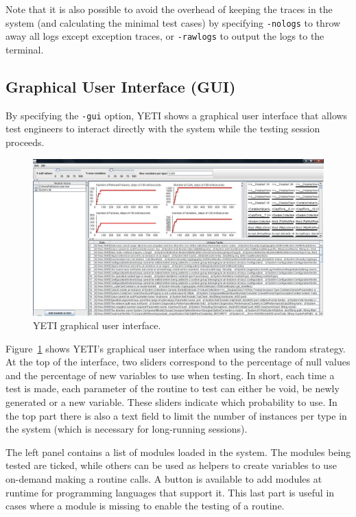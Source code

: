 Note that it is also possible to avoid the overhead of keeping the 
traces in the system (and calculating the minimal test cases) by specifying 
\texttt{-nologs} to throw away all logs except exception traces, or 
\texttt{-rawlogs} to output the logs to the terminal.

\subsection{Graphical User Interface (GUI)}
By specifying the \texttt{-gui} option, YETI shows a graphical user interface
that allows test engineers to interact directly with the system while the testing 
session proceeds. 

\begin{figure}[h!]
\begin{center}
\begin{sideways}
\includegraphics[width=24cm]{images/ScreenShotdotNET.png}
\end{sideways}
\end{center}
\caption{YETI graphical user interface.}\label{fig:gui}
\end{figure}


Figure~\ref{fig:gui} shows YETI's graphical user interface when using 
the random strategy. At the top of the interface, two sliders correspond to 
the percentage of null values and the percentage of new variables to use when testing.
In short, each time a test is made, each parameter of the routine to test can either 
be void, be newly generated or a new variable. These sliders indicate which probability 
to use. In the top part there is also a text field to limit the number of instances per 
type in the system (which is necessary for long-running sessions).

The left panel contains a list of modules loaded in 
the system. The modules being tested are ticked, while others can be used as helpers to 
create variables to use on-demand making a routine calls. A button is available to add modules 
at runtime for programming languages that support it. This last part is useful in cases 
where a module is missing to enable the testing of a routine. 

